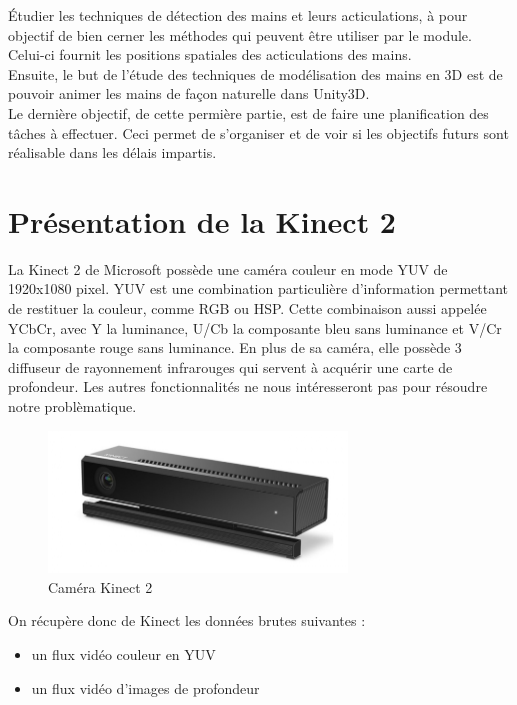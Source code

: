 Étudier les techniques de détection des mains et leurs acticulations, 
à pour objectif de bien cerner les méthodes qui peuvent être utiliser 
par le module. Celui-ci fournit les positions spatiales des 
acticulations des mains.\\

Ensuite, le but de l'étude des techniques de modélisation des mains en 
3D est de pouvoir animer les mains de façon naturelle dans Unity3D.\\

Le dernière objectif, de cette permière partie, est de faire une 
planification des tâches à effectuer. Ceci permet de s'organiser et 
de voir si les objectifs futurs sont réalisable dans les délais 
impartis.\\  


\section{Présentation de la Kinect 2}
La Kinect 2 de Microsoft possède une caméra couleur en mode YUV de 1920x1080 pixel.
YUV est une combination particulière d'information permettant de restituer la couleur, comme RGB ou HSP.
Cette combinaison aussi appelée YCbCr, avec Y la luminance, U/Cb la composante bleu sans luminance et V/Cr la composante rouge sans luminance.
En plus de sa caméra, elle possède 3 diffuseur de rayonnement infrarouges qui servent à acquérir une carte de profondeur.
Les autres fonctionnalités ne nous intéresseront pas pour résoudre notre problèmatique.\\

\begin{figure}[H]
 \center
 \includegraphics[width=300px]{images/kinect-v2.png}
 \caption{Caméra Kinect 2}
\end{figure}

On récupère donc de Kinect les données brutes suivantes : 
\begin{itemize}
 \item un flux vidéo couleur en YUV
 \item un flux vidéo d'images de profondeur
\end{itemize}

